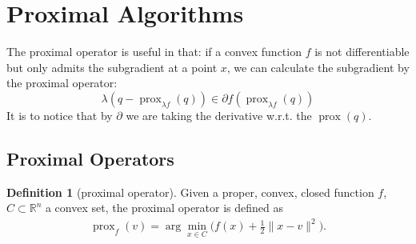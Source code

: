 \documentclass[a4paper,11pt,fleqn, draft]{book}
\newtheorem{theorem}{Theorem}[section]
\theoremstyle{definition}
\newtheorem{definition}{Definition}[section]
\newtheorem{assumption}{Assumption}[section]
\theoremstyle{remark}
\DeclareMathOperator{\dom}{dom}
\DeclareMathOperator*{\core}{core}
\DeclareMathOperator*{\prox}{prox}
\begin{document}



\section{Proximal Algorithms}
The proximal operator is useful in that: if a convex function $f$ is not differentiable but only admits the subgradient at a point $x$, we can calculate the subgradient by the proximal operator:
\begin{equation*}
    \lambda (q - \prox\nolimits_{\lambda f}(q) ) \in \partial f(\prox\nolimits_{\lambda f}(q))
\end{equation*}
It is to notice that by $\partial$ we are taking the derivative w.r.t. the $\prox (q)$.
\subsection{Proximal Operators}
\begin{definition}[proximal operator]
	Given a proper, convex, closed function $f$, $C \subset \mathbb{R}^n $ a convex set, the proximal operator is defined as
	\begin{align*}
		\prox\nolimits_f (v) = \arg \min_{x \in C} \bigg(f(x) + \frac{1}{2} \|x - v\|^2 \bigg).
	\end{align*}
\end{definition}
\end{document}
